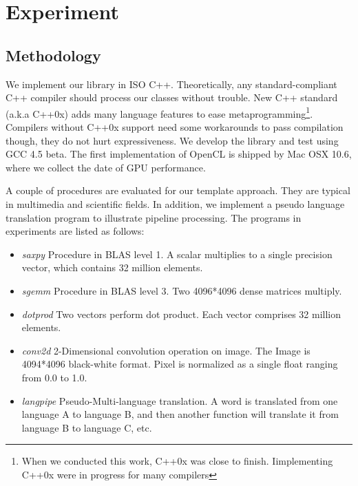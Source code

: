 \section{Experiment}\label{sec:eval}
\subsection{Methodology}\label{sectn:method}
We implement our library in ISO
C++. Theoretically, any standard-compliant C++ compiler
should process our classes without trouble. New C++ standard (a.k.a C++0x\cite{c++0x}) adds many language features to ease metaprogramming\footnote{When we
  conducted this work, C++0x was close to finish. Iimplementing C++0x
  were in progress for many compilers}. Compilers
without C++0x support need some workarounds to pass compilation
though, they do not hurt expressiveness. We develop the library and
test using GCC 4.5 beta.  The
first implementation of OpenCL is shipped by Mac OSX 10.6, where we
collect the date of GPU performance.


A couple of procedures are evaluated for our template approach.  They
are typical in multimedia and scientific fields. In
addition, we implement a pseudo language translation program to
illustrate pipeline processing. The programs in experiments are listed
as follows:

\begin{itemize}
\item \textit{saxpy} Procedure in BLAS level 1. A scalar multiplies to a single precision vector, which contains 32 million elements.
\item \textit{sgemm} Procedure in BLAS level 3. Two 4096*4096 dense matrices multiply.
\item \textit{dotprod} Two vectors perform dot product. Each vector
  comprises 32 million elements.
\item \textit{conv2d} 2-Dimensional convolution operation on image.  The Image
  is 4094*4096 black-white format. Pixel is normalized as a single
  float ranging from 0.0 to 1.0.
\item \textit{langpipe} Pseudo-Multi-language translation. A word is translated from one language A to language B, and then another function will translate it from language B to language C, etc.
\end{itemize}

